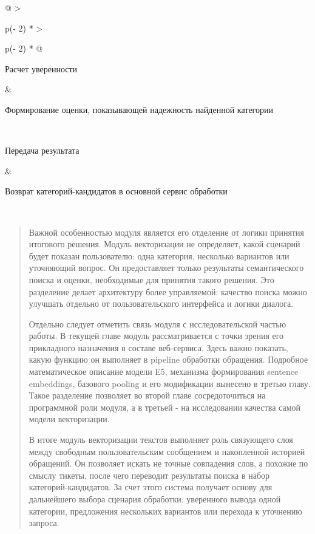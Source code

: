 \begin{longtable}[]{@{}
  >{\raggedright\arraybackslash}p{(\columnwidth - 2\tabcolsep) * }
  >{\raggedright\arraybackslash}p{(\columnwidth - 2\tabcolsep) * }@{}}
\begin{minipage}[b]{\linewidth}\raggedright
Расчет уверенности
\end{minipage} & \begin{minipage}[b]{\linewidth}\raggedright
Формирование оценки, показывающей надежность найденной категории
\end{minipage} \\
\begin{minipage}[b]{\linewidth}\raggedright
Передача результата
\end{minipage} & \begin{minipage}[b]{\linewidth}\raggedright
Возврат категорий-кандидатов в основной сервис обработки
\end{minipage} \\
\midrule\noalign{}
\endhead
\bottomrule\noalign{}
\endlastfoot
\end{longtable}

\begin{quote}
Важной особенностью модуля является его отделение от логики принятия
итогового решения. Модуль векторизации не определяет, какой сценарий
будет показан пользователю: одна категория, несколько вариантов или
уточняющий вопрос. Он предоставляет только результаты семантического
поиска и оценки, необходимые для принятия такого решения. Это разделение
делает архитектуру более управляемой: качество поиска можно улучшать
отдельно от пользовательского интерфейса и логики диалога.

Отдельно следует отметить связь модуля с исследовательской частью
работы. В текущей главе модуль рассматривается с точки зрения его
прикладного назначения в составе веб-сервиса. Здесь важно показать,
какую функцию он выполняет в pipeline обработки обращения. Подробное
математическое описание модели E5, механизма формирования sentence
embeddings, базового pooling и его модификации вынесено в третью главу.
Такое разделение позволяет во второй главе сосредоточиться на
программной роли модуля, а в третьей - на исследовании качества самой
модели векторизации.

В итоге модуль векторизации текстов выполняет роль связующего слоя между
свободным пользовательским сообщением и накопленной историей обращений.
Он позволяет искать не точные совпадения слов, а похожие по смыслу
тикеты, после чего переводит результаты поиска в набор
категорий-кандидатов. За счет этого система получает основу для
дальнейшего выбора сценария обработки: уверенного вывода одной
категории, предложения нескольких вариантов или перехода к уточнению
запроса.
\end{quote}

